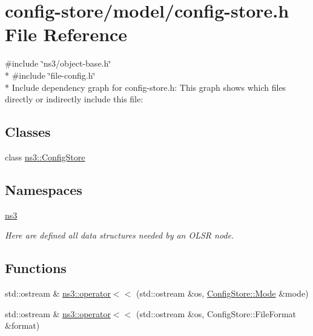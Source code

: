 \hypertarget{config-store_8h}{}\section{config-\/store/model/config-\/store.h File Reference}
\label{config-store_8h}
{\ttfamily \#include \char`\"{}ns3/object-\/base.\+h\char`\"{}}\\*
{\ttfamily \#include \char`\"{}file-\/config.\+h\char`\"{}}\\*
Include dependency graph for config-\/store.h\+:
This graph shows which files directly or indirectly include this file\+:
\subsection*{Classes}
\begin{DoxyCompactItemize}
\item 
class \hyperlink{classns3_1_1ConfigStore}{ns3\+::\+Config\+Store}
\end{DoxyCompactItemize}
\subsection*{Namespaces}
\begin{DoxyCompactItemize}
\item 
 \hyperlink{namespacens3}{ns3}
\begin{DoxyCompactList}\small\item\em Here are defined all data structures needed by an O\+L\+SR node. \end{DoxyCompactList}\end{DoxyCompactItemize}
\subsection*{Functions}
{\bf }\par
\begin{DoxyCompactItemize}
\item 
std\+::ostream \& \hyperlink{group__configstore_ga289c47e33b83129aced7736ba7c7960a}{ns3\+::operator$<$$<$} (std\+::ostream \&os, \hyperlink{lte__uplink__power__control_8m_a21de820aff859dc731034b432a16fa96}{Config\+Store\+::\+Mode} \&mode)
\item 
std\+::ostream \& \hyperlink{group__configstore_ga54d3ccba7f4a9b747b2d0c61b4e3db95}{ns3\+::operator$<$$<$} (std\+::ostream \&os, Config\+Store\+::\+File\+Format \&format)
\end{DoxyCompactItemize}

